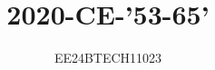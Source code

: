\documentclass[journal,12pt,onecolumn]{IEEEtran}
\theoremstyle{remark}
\begin{document}

\vspace{3cm}


\title{2020-CE-'53-65'}
\author{EE24BTECH11023}
\maketitle

{\let\newpage\relax\maketitle}

\renewcommand{\thefigure}{\theenumi}
\renewcommand{\thetable}{\theenumi}
\setlength{\intextsep}{10pt} %


\renewcommand{\thetable}{\theenumi}
\end{document}

